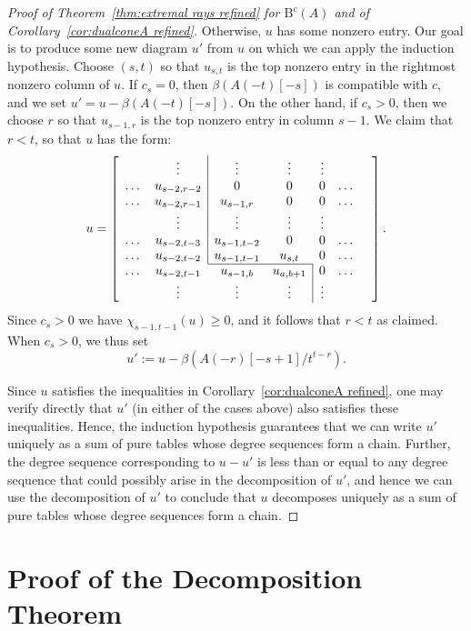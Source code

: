 \documentclass[12pt]{amsart}
\theoremstyle{definition}
\theoremstyle{remark}
\newcommand{\cc}{c}
\newcommand{\BBQ}{\mathrm{B}}
\begin{document}
\begin{proof}[Proof of Theorem~\ref{thm:extremal rays refined} for $\BBQ^{\cc}(A)$ and of Corollary~\ref{cor:dualconeA refined}]
Otherwise, $u$ has some nonzero entry.  Our goal is to produce some new diagram $u'$ from $u$ on which we can apply the induction hypothesis.  Choose $(s,t)$ so that $u_{s,t}$ is the top nonzero entry in the rightmost nonzero column of $u$.
If $c_s=0$, then $\beta(A(-t)[-s])$ is compatible with $\cc$, and we set $u'=u-\beta(A(-t)[-s])$.  On the other hand, if $c_s>0$, then we choose $r$ so that $u_{s-1,r}$ is the top nonzero entry in column $s-1$.  We claim that $r<t$, so that $u$ has the form:
\[
u=
\left[
\begin{array}{ccccccc}
 & \vdots& \multicolumn{1}{|c}{\vdots}&\vdots& \vdots&&\\
\dots&u_{s-2,r-2}&\multicolumn{1}{|c}{0}&0&0&\dots\\
\dots&u_{s-2,r-1}&\multicolumn{1}{|c}{u_{s-1,r}}&0&0&\dots\\
 & \vdots& \multicolumn{1}{|c}{\vdots}&\vdots& \vdots&&\\
\dots&u_{s-2,t-3}&\multicolumn{1}{|c}{u_{s-1,t-2}}&0&0&\dots\\
\dots&u_{s-2,t-2}&\multicolumn{1}{|c}{u_{s-1,t-1}}&u_{s,t}&0&\dots\\ \cline{3-4}
\dots&u_{s-2,t-1}&u_{s-1,b}&u_{a,b+1}&\multicolumn{1}{|c}{0}&\dots\\
& \vdots&\vdots&\vdots& \multicolumn{1}{|c}{\vdots}&&\\
\end{array}\right].
\]
Since $c_s>0$ we have $\chi_{s-1,t-1}(u)\geq 0$, and it follows that $r<t$ as claimed.  When $c_s>0$, we thus set
\[
u':=u-\beta(A(-r)[-s+1]/t^{t-r}).
\]

Since $u$ satisfies the inequalities in Corollary~\ref{cor:dualconeA refined}, one may verify directly that $u'$ (in either of the cases above) also satisfies these inequalities.  Hence, the induction hypothesis guarantees that we can write $u'$ uniquely as a sum of pure tables whose degree sequences form a chain.  Further, the degree sequence corresponding to $u-u'$ is less than or equal to any degree sequence that could possibly arise in the decomposition of $u'$, and hence we can use the decomposition of $u'$ to conclude that $u$ decomposes uniquely as a sum of pure tables whose degree sequences form a chain.
\end{proof}




\section{Proof of the Decomposition Theorem}\label{sec:refined proof}\label{sec:general case}
\end{document}
